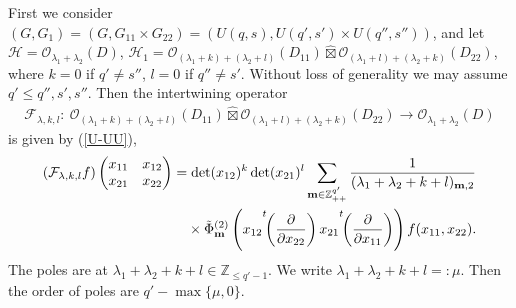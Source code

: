 \documentclass[pdftex]{sigma}
\numberwithin{equation}{section}
\newcommand{\bm}{\mathbf{m}}
\newcommand{\BZ}{\mathbb{Z}}
\newcommand{\cF}{\mathcal{F}}
\newcommand{\cH}{\mathcal{H}}
\newcommand{\cO}{\mathcal{O}}
\newcommand{\hboxtimes}{\mathbin{\hat{\boxtimes}}}
\begin{document}
First we consider $(G,G_1)=(G,G_{11}\times G_{22})=(U(q,s),U(q',s')\times U(q'',s''))$, and let $\cH=\cO_{\lambda_1+\lambda_2}(D)$, $\cH_1=\cO_{(\lambda_1+k)+(\lambda_2+l)}(D_{11})\hboxtimes\cO_{(\lambda_1+l)+(\lambda_2+k)}(D_{22})$, where $k=0$ if $q'\ne s''$, $l=0$ if $q''\ne s'$. Without loss of generality we may assume $q'\le q'',s',s''$. Then the intertwining operator
\begin{gather*} \cF_{\lambda,k,l}\colon \ \cO_{(\lambda_1+k)+(\lambda_2+l)}(D_{11}) \hboxtimes \cO_{(\lambda_1+l)+(\lambda_2+k)}(D_{22})
\to \cO_{\lambda_1+\lambda_2}(D) \end{gather*}
is given by (\ref{U-UU}),
\begin{gather*}
(\cF_{\lambda,k,l}f)\begin{pmatrix}x_{11}&x_{12}\\x_{21}&x_{22}\end{pmatrix}
 =\det(x_{12})^k\det(x_{21})^l
\sum_{\bm\in\BZ_{++}^{q'}}\frac{1}{(\lambda_1+\lambda_2+k+l)_{\bm,2}}\\
\hphantom{(\cF_{\lambda,k,l}f)\begin{pmatrix}x_{11}&x_{12}\\x_{21}&x_{22}\end{pmatrix}=}{} \times\tilde{\Phi}_\bm^{(2)}
\left(x_{12}{\vphantom{\biggl(}}^t\!\!\left(\frac{\partial}{\partial x_{22}}\right)x_{21}
{\vphantom{\biggl(}}^t\!\!\left(\frac{\partial}{\partial x_{11}}\right)\right)f(x_{11},x_{22}).
\end{gather*}
The poles are at $\lambda_1+\lambda_2+k+l\in \BZ_{\le q'-1}$. We write $\lambda_1+\lambda_2+k+l=:\mu$. Then the order of poles are $q'-\max\{\mu,0\}$.
\end{document}
